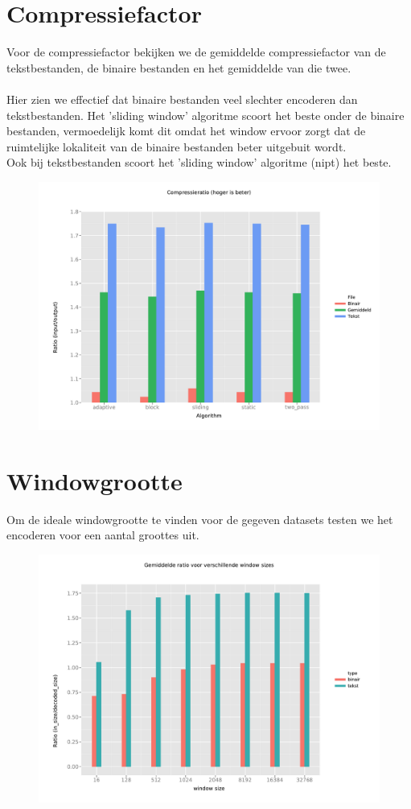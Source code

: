 \documentclass[a4paper,12pt]{report}
\begin{document}
\section{Compressiefactor}
Voor de compressiefactor bekijken we de gemiddelde compressiefactor van de tekstbestanden, de binaire bestanden en het gemiddelde van die twee. \\ \\
Hier zien we effectief dat binaire bestanden veel slechter encoderen dan tekstbestanden. Het 'sliding window' algoritme scoort het beste onder de binaire bestanden, vermoedelijk komt dit omdat het window ervoor zorgt dat de ruimtelijke lokaliteit van de binaire bestanden beter uitgebuit wordt. \\ 
Ook bij tekstbestanden scoort het 'sliding window' algoritme (nipt) het beste.
\begin{figure}[H]
	\includegraphics[scale=.6]{../experimenten/grafieken/ratios/ratio}
\end{figure}

\section{Windowgrootte}
Om de ideale windowgrootte te vinden voor de gegeven datasets testen we het encoderen voor een aantal groottes uit.
\begin{figure}[H]
	\includegraphics[scale=.6]{../experimenten/window_avg_ratio}
\end{figure}
\end{document}

